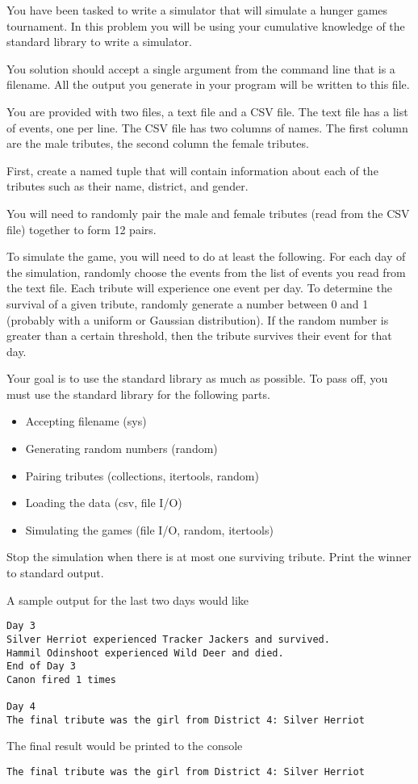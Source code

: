 \begin{problem}
You have been tasked to write a simulator that will simulate a hunger games tournament.
In this problem you will be using your cumulative knowledge of the standard library to write a simulator.

You solution should accept a single argument from the command line that is a filename.  All the output you generate in your program will be written to this file.

You are provided with two files, a text file and a CSV file.
The text file has a list of events, one per line.
The CSV file has two columns of names.
The first column are the male tributes, the second column the female tributes.

First, create a named tuple that will contain information about each of the tributes such as their name, district, and gender.

You will need to randomly pair the male and female tributes (read from the CSV file) together to form 12 pairs.

To simulate the game, you will need to do at least the following.
For each day of the simulation, randomly choose the events from the list of events you read from the text file.
Each tribute will experience one event per day.
To determine the survival of a given tribute, randomly generate a number between 0 and 1 (probably with a uniform or Gaussian distribution).  If the random number is greater than a certain threshold, then the tribute survives their event for that day.

Your goal is to use the standard library as much as possible.
To pass off, you must use the standard library for the following parts.
\begin{itemize}
\item Accepting filename (sys)
\item Generating random numbers (random)
\item Pairing tributes (collections, itertools, random)
\item Loading the data (csv, file I/O)
\item Simulating the games (file I/O, random, itertools)
\end{itemize}

Stop the simulation when there is at most one surviving tribute.
Print the winner to standard output.

A sample output for the last two days would like
\begin{lstlisting}[style=ShellOutput]
Day 3
Silver Herriot experienced Tracker Jackers and survived.
Hammil Odinshoot experienced Wild Deer and died.
End of Day 3
Canon fired 1 times

Day 4
The final tribute was the girl from District 4: Silver Herriot
\end{lstlisting}
The final result would be printed to the console
\begin{lstlisting}[style=ShellOutput]
The final tribute was the girl from District 4: Silver Herriot
\end{lstlisting}
\end{problem}

